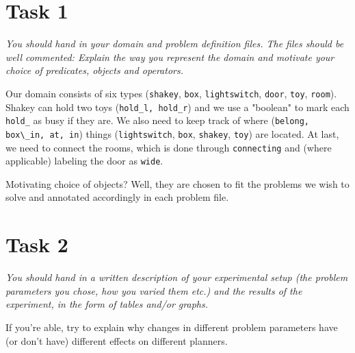 \section{Task 1}
\begin{framed}\em You should hand in your domain and problem definition files. The files should be well commented: Explain the way you represent the domain and motivate your choice of predicates, objects and operators.\em
\end{framed}
Our domain consists of six types (\verb=shakey=, \verb=box=, \verb=lightswitch=, \verb=door=, \verb=toy=, \verb=room=). Shakey can hold two toys (\verb=hold_l, hold_r=) and we use a "boolean" to mark each \verb=hold_= as busy if they are. We also need to keep track of where (\verb=belong, box\_in, at, in=) things (\verb=lightswitch=, \verb=box=, \verb=shakey=, \verb=toy=) are located. At last, we need to connect the rooms, which is done through \verb=connecting= and (where applicable) labeling the door as \verb=wide=.

Motivating choice of objects? Well, they are chosen to fit the problems we wish to solve and annotated accordingly in each problem file.

\section{Task 2}
\begin{framed}\em You should hand in a written description of your experimental setup (the problem parameters you chose, how you varied them etc.) and the results of the experiment, in the form of tables and/or graphs.

If you're able, try to explain why changes in different problem parameters have (or don't have) different effects on different planners.\em\end{framed}

